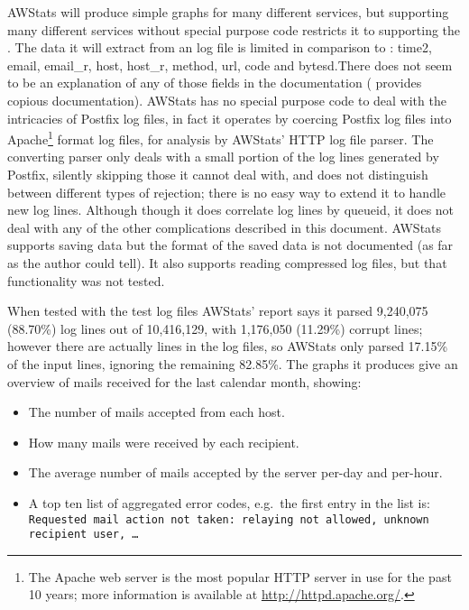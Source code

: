 AWStats will produce simple graphs for many different services, but
supporting many different services without special purpose code restricts
it to supporting the \LCD{}.  The data it will extract from an \MTA{} log
file is limited in comparison to \parsername{}: \newline \tab{} time2,
email, email\_r, host, host\_r, method, url, code and bytesd.\newline There
does not seem to be an explanation of any of those fields in the
documentation (\parsername{} provides copious documentation).  AWStats has
no special purpose code to deal with the intricacies of Postfix log files,
in fact it operates by coercing Postfix log files into Apache\footnote{The
Apache web server is the most popular HTTP server in use for the past 10
years; more information is available at \url{http://httpd.apache.org/}.}
format log files, for analysis by AWStats' HTTP log file parser.  The
converting parser only deals with a small portion of the log lines
generated by Postfix, silently skipping those it cannot deal with, and does
not distinguish between different types of rejection; there is no easy way
to extend it to handle new log lines.  Although though it does correlate
log lines by queueid, it does not deal with any of the other complications
described in this document.  AWStats supports saving data but the format of
the saved data is not documented (as far as the author could tell).  It
also supports reading compressed log files, but that functionality was not
tested.

When tested with the \numberOFlogFILES{} test log files AWStats' report
says it parsed 9,240,075 (88.70\%) log lines out of 10,416,129, with
1,176,050 (11.29\%) corrupt lines; however there are actually
\numberOFlogLINES{} lines in the \numberOFlogFILES{} log files, so AWStats
only parsed 17.15\% of the input lines, ignoring the remaining 82.85\%.
The graphs it produces give an overview of mails received for the last
calendar month, showing:

\begin{itemize}

    \item The number of mails accepted from each host.

    \item How many mails were received by each recipient.
        
    \item The average number of mails accepted by the server per-day and
        per-hour.

    \item A top ten list of aggregated \SMTP{} error codes, e.g.\ the first
        entry in the list is: \texttt{Requested mail action not taken:
        relaying not allowed, unknown recipient user, \ldots}

\end{itemize}

